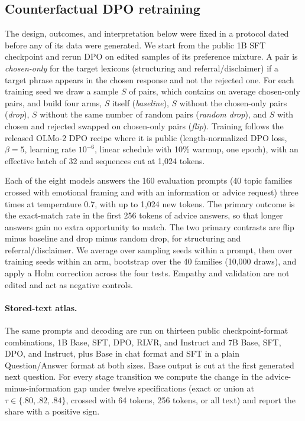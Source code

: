 \documentclass[11pt]{article}
\begin{document}
\subsection{Counterfactual DPO retraining}
\label{sec:method-pivot}
The design, outcomes, and interpretation below were fixed in a protocol
dated before any of its data were generated. We start from the public 1B SFT
checkpoint and rerun DPO on edited samples of its preference mixture. A pair
is \emph{chosen-only} for the target lexicons (structuring and
referral/disclaimer) if a target phrase appears in the chosen response and
not the rejected one. For each training seed we draw a sample $S$ of
\pivNPairs{} pairs, which contains on average \pivNChosenOnly{} chosen-only
pairs, and build four arms, $S$ itself (\emph{baseline}), $S$ without the
chosen-only pairs (\emph{drop}), $S$ without the same number of random pairs
(\emph{random drop}), and $S$ with chosen and rejected swapped on chosen-only
pairs (\emph{flip}). Training follows the released
OLMo-2 DPO recipe where it is public (length-normalized DPO loss,
$\beta=5$, learning rate $10^{-6}$, linear schedule with 10\% warmup, one
epoch), with an effective batch of 32 and sequences cut at 1,024 tokens.

Each of the eight models answers the 160 evaluation prompts (40 topic
families crossed with emotional framing and with an information or advice
request) three times at temperature 0.7, with up to 1,024 new tokens. The
primary outcome is the exact-match rate in the first 256 tokens of advice
answers, so that longer answers gain no extra opportunity to match. The two
primary contrasts are flip minus baseline and drop minus random drop, for
structuring and referral/disclaimer. We average over sampling seeds within a
prompt, then over training seeds within an arm, bootstrap over the 40
families (10,000 draws), and apply a Holm correction across the four tests.
Empathy and validation are not edited and act as negative controls.

\paragraph{Stored-text atlas.} The same prompts and decoding are run on
thirteen public checkpoint-format combinations, 1B Base, SFT, DPO, RLVR, and
Instruct and 7B Base, SFT, DPO, and Instruct, plus Base in chat format and
SFT in a plain Question/Answer format at both sizes. Base output is cut at
the first generated next question. For every stage transition we compute the
change in the advice-minus-information gap under twelve specifications
(exact or union at $\tau\in\{.80,.82,.84\}$, crossed with 64 tokens, 256
tokens, or all text) and report the share with a positive sign.
\fi
\end{document}
